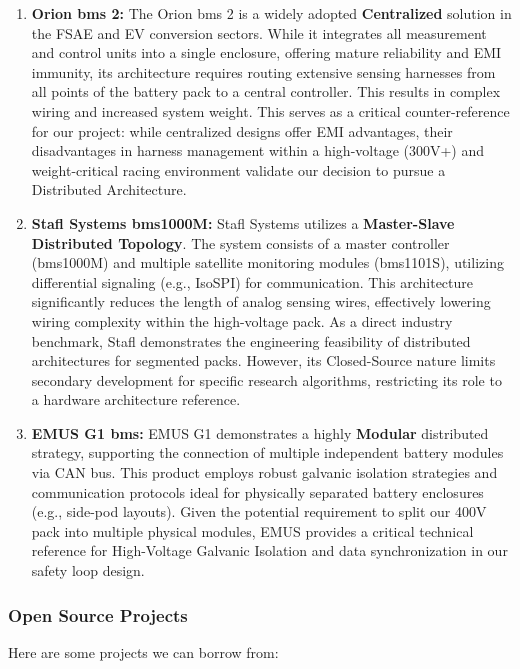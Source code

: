 \begin{enumerate}
	\item \textbf{Orion \gls{bms} 2:} The Orion \gls{bms} 2 is a widely adopted \textbf{Centralized} solution in the FSAE and EV conversion sectors. While it integrates all measurement and control units into a single enclosure, offering mature reliability and EMI immunity, its architecture requires routing extensive sensing harnesses from all points of the battery pack to a central controller. This results in complex wiring and increased system weight. This serves as a critical counter-reference for our project: while centralized designs offer EMI advantages, their disadvantages in harness management within a high-voltage (300V+) and weight-critical racing environment validate our decision to pursue a Distributed Architecture.
	
	\item \textbf{Stafl Systems \gls{bms}1000M:} Stafl Systems utilizes a \textbf{Master-Slave Distributed Topology}. The system consists of a master controller (\gls{bms}1000M) and multiple satellite monitoring modules (\gls{bms}1101S), utilizing differential signaling (e.g., IsoSPI) for communication. This architecture significantly reduces the length of analog sensing wires, effectively lowering wiring complexity within the high-voltage pack. As a direct industry benchmark, Stafl demonstrates the engineering feasibility of distributed architectures for segmented packs. However, its Closed-Source nature limits secondary development for specific research algorithms, restricting its role to a hardware architecture reference.
	
	\item \textbf{EMUS G1 \gls{bms}:} EMUS G1 demonstrates a highly \textbf{Modular} distributed strategy, supporting the connection of multiple independent battery modules via CAN bus. This product employs robust galvanic isolation strategies and communication protocols ideal for physically separated battery enclosures (e.g., side-pod layouts). Given the potential requirement to split our 400V pack into multiple physical modules, EMUS provides a critical technical reference for High-Voltage Galvanic Isolation and data synchronization in our safety loop design.
\end{enumerate}

\subsubsection{Open Source Projects}
Here are some projects we can borrow from:

